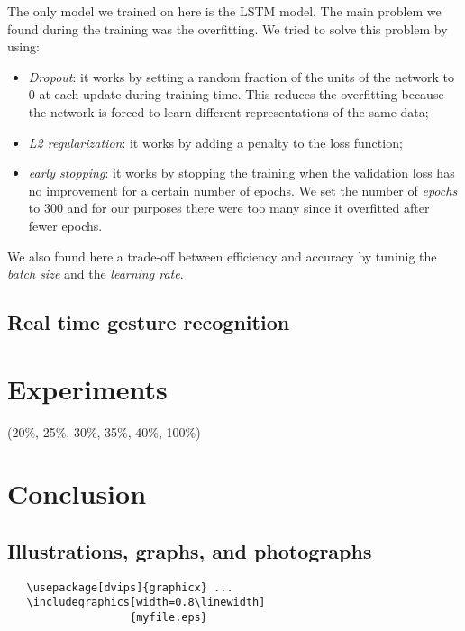 \documentclass[10pt,twocolumn,letterpaper]{article}
\begin{document}
The only model we trained on here is the LSTM model. The main problem we found during the training 
was the overfitting. We tried to solve this problem by using:
\begin{itemize}
   \item \textit{Dropout}: it works by setting a random fraction of the units of the network to 0 
   at each update during training time. This reduces the overfitting 
   because the network is forced to learn different representations of the same data;
   \item \textit{L2 regularization}: it works by adding a penalty to the loss function;
   \item \textit{early stopping}: it works by stopping the training when the validation loss 
   has no improvement for a certain number of epochs. We set the number of \textit{epochs} to 
   300 and for our purposes there were too many since it overfitted after fewer epochs.
\end{itemize}
We also found here a trade-off between efficiency and accuracy by tuninig 
the \textit{batch size} and the \textit{learning rate}.





\subsection{Real time gesture recognition}

\section{Experiments}
(20\%, 25\%, 30\%, 35\%, 40\%, 100\%)

\section{Conclusion}






\subsection{Illustrations, graphs, and photographs}

{\small\begin{verbatim}
   \usepackage[dvips]{graphicx} ...
   \includegraphics[width=0.8\linewidth]
                   {myfile.eps}
\end{verbatim}
}


{\small


}
\end{document}
